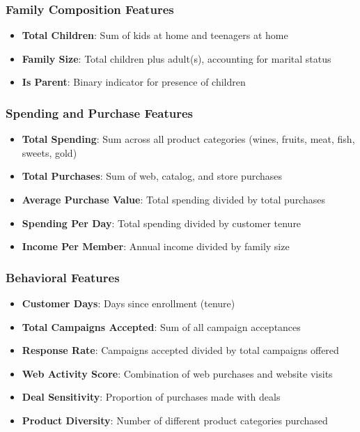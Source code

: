 \documentclass[12pt,a4paper]{report}
\begin{document}
\subsubsection{Family Composition Features}
\begin{itemize}
    \item \textbf{Total Children}: Sum of kids at home and teenagers at home
    \item \textbf{Family Size}: Total children plus adult(s), accounting for marital status
    \item \textbf{Is Parent}: Binary indicator for presence of children
\end{itemize}

\subsubsection{Spending and Purchase Features}
\begin{itemize}
    \item \textbf{Total Spending}: Sum across all product categories (wines, fruits, meat, fish, sweets, gold)
    \item \textbf{Total Purchases}: Sum of web, catalog, and store purchases
    \item \textbf{Average Purchase Value}: Total spending divided by total purchases
    \item \textbf{Spending Per Day}: Total spending divided by customer tenure
    \item \textbf{Income Per Member}: Annual income divided by family size
\end{itemize}

\subsubsection{Behavioral Features}
\begin{itemize}
    \item \textbf{Customer Days}: Days since enrollment (tenure)
    \item \textbf{Total Campaigns Accepted}: Sum of all campaign acceptances
    \item \textbf{Response Rate}: Campaigns accepted divided by total campaigns offered
    \item \textbf{Web Activity Score}: Combination of web purchases and website visits
    \item \textbf{Deal Sensitivity}: Proportion of purchases made with deals
    \item \textbf{Product Diversity}: Number of different product categories purchased
\end{itemize}
\end{document}
